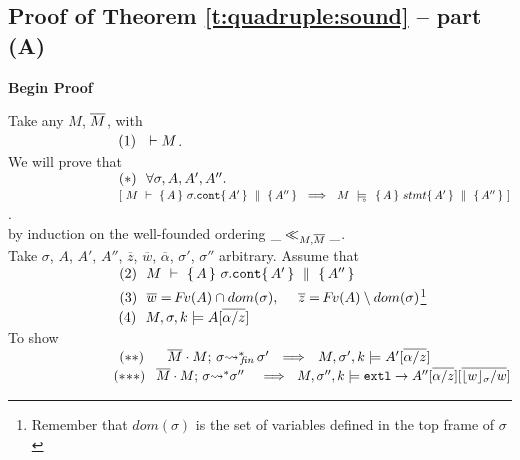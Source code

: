 \newcommand{\SPSF}{\SPS \ \ \ \ \ \ \ }
\newcommand{\Apr}{A_{pr}}

\subsection{Proof of Theorem \ref{t:quadruple:sound} -- part (A) }
\label{s:app:proof:sketch;quadruples}
\noindent
\vspace{.2cm}
  {\textbf{Begin Proof}} 


\noindent
Take any $M$, $\overline{M}$, with\\ 
$\strut \ \ \hspace{2.3cm} \ \ (1) \ \ \vdash M $.
\\
We will prove that\\
$\strut \ \ \hspace{2.3cm} \ \ (*)\ \ \forall \sigma, A, A', A''.$\\
$\strut \ \ \hspace{2.3cm} \ \ \ \ \  \ \ [ \ M\ \vdash\  \quadruple {A} {\sigma.\prg{cont}} {A'} {A''}  \ \ \Longrightarrow \ \    M\ \modelsD\  \quadruple {A} {stmt} {A'} {A''}\ ]$.\\
by induction on the well-founded ordering  $\_ \ll_{M,\overline{M}}  \_$.
\\
Take $\sigma$, $A$, $A'$, $A''$, $\overline z$, $\overline w$, $\overline \alpha$, $\sigma'$, $\sigma''$  arbitrary. Assume that\\
$\strut \ \ \hspace{2.3cm} \ \ (2) \ \ M\ \vdash\  \quadruple {A} {\sigma.\prg{cont}} {A'} {A''}$\\
$\strut \ \ \hspace{2.3cm} \ \ (3) \ \ \overline {w}=\fv(A)\cap dom(\sigma), \  \ \ \  \overline z = {\fv(A)\setminus dom(\sigma)}$\footnote{Remember that $dom(\sigma)$ is the set of variables defined in the top frame of $\sigma$} \\
$\strut \ \ \hspace{2.3cm} \ \ (4) \ \ \satDAssertFrom M  \sigma k   {A{[{\overline { \alpha/z}]}}}$\\
To show\\
$\strut \ \ \hspace{2.3cm} \ \ (**)\ \ \  \ \    \leadstoBoundedStarFin {\Mtwo\cdot M}  {\sigma}  {\sigma'}\ \ \Longrightarrow\ \     \satDAssertFrom M  {\sigma'} k   {{A'}{[{\overline {\alpha/z}]}}}$\\
$\strut \ \ \hspace{2.3cm} \ \ (*\!*\!*) \ \ \,    \leadstoBoundedStar  {\Mtwo\cdot M}  {\sigma}  {\sigma''}\ \, \ \ \Longrightarrow\ \     \satDAssertFrom M  {\sigma''}  k  \extThis \rightarrow {{A''[{\overline {\alpha/z}}][\overline{\interpret \sigma {w}/w}]}}$
 
